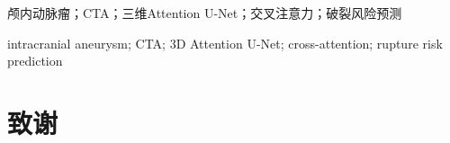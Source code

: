 \documentclass[UTF8,a4paper,12pt,fontset=none,linespread=1,oneside]{ctexart}
\begin{document}
\CQUmakecover
\CQUfrontmatter

\begin{CQUChineseAbstract}{颅内动脉瘤；CTA；三维Attention U-Net；交叉注意力；破裂风险预测}

\end{CQUChineseAbstract}

\begin{CQUEnglishAbstract}{intracranial aneurysm; CTA; 3D Attention U-Net; cross-attention; rupture risk prediction}

\end{CQUEnglishAbstract}

\CQUtableofcontents
\CQUmainmatter







\CQUprintbibliography

\newpage
{}


\newpage
{}
\CQUblankline
\section*{致\quad 谢}
\CQUblankline


\CQUmakedeclaration
\end{document}
